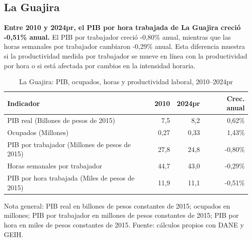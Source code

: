 \subsection{La Guajira}
\textbf{Entre 2010 y 2024pr, el PIB por hora trabajada de La Guajira creció -0,51\% anual.} El PIB por trabajador creció -0,80\% anual, mientras que las horas semanales por trabajador cambiaron -0,29\% anual. Esta diferencia muestra si la productividad medida por trabajador se mueve en línea con la productividad por hora o si está afectada por cambios en la intensidad horaria.
\begin{table}[H]
\centering
\caption{La Guajira: PIB, ocupados, horas y productividad laboral, 2010--2024pr}
\label{tab:departamento_la_guajira_productividad}
\scriptsize
\begin{tabular}{lrrr}
\toprule
Indicador & 2010 & 2024pr & Crec. anual \\
\midrule
PIB real (Billones de pesos de 2015) & 7,5 & 8,2 & 0,62\% \\
Ocupados (Millones) & 0,27 & 0,33 & 1,43\% \\
PIB por trabajador (Millones de pesos de 2015) & 27,8 & 24,8 & -0,80\% \\
Horas semanales por trabajador & 44,7 & 43,0 & -0,29\% \\
PIB por hora trabajada (Miles de pesos de 2015) & 11,9 & 11,1 & -0,51\% \\
\bottomrule
\end{tabular}
\end{table}

{\footnotesize Nota general: PIB real en billones de pesos constantes de 2015; ocupados en millones; PIB por trabajador en millones de pesos constantes de 2015; PIB por hora en miles de pesos constantes de 2015. Fuente: cálculos propios con DANE y GEIH.}